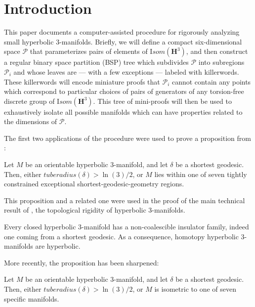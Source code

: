 \def\Arccosh{{\mathrm Arccosh}}
\chapter{Introduction}\label{Ch.intro}

This paper documents a computer-assisted procedure
for rigorously analyzing small hyperbolic $3$-manifolds.
Briefly, we will define a compact six-dimensional space ${\mathcal P}$
that parameterizes pairs of elements of ${\mathrm Isom}({\mathbf H}^3)$,
and then construct a regular binary space partition (BSP) tree
which subdivides ${\mathcal P}$ into subregions ${\mathcal P_i}$
and whose leaves are --- with a few exceptions --- labeled with killerwords.
These killerwords will encode miniature proofs that ${\mathcal P_i}$
cannot contain any points which correspond to
particular choices of pairs of generators of
any torsion-free discrete group of ${\mathrm Isom}({\mathbf H}^3)$.
This tree of mini-proofs will then be used
to exhaustively isolate all possible manifolds
which can have properties related to the dimensions of ${\mathcal P}$.

The first two applications of the procedure
were used to prove a proposition from \cite{GMT}:

\begin{proposition}{\cite{GMT}}
Let $M$ be an orientable hyperbolic $3$-manifold, and let $\delta$ be
a shortest geodesic. Then, either ${\mathit tuberadius}(\delta) > \ln(3)/2$,
or $M$ lies within one of seven tightly constrained
exceptional shortest-geodesic-geometry regions.
\end{proposition}

This proposition and a related one were used in the proof of
the main technical result of \cite{GMT}, the topological rigidity of hyperbolic 3-manifolds. 

\begin{theorem}{\cite{GMT}}\label{GMT 0.2}
Every closed hyperbolic $3$-manifold
has a non-coalescible insulator family,
indeed one coming from a shortest geodesic.
As a consequence,
homotopy hyperbolic $3$-manifolds are hyperbolic.
\end{theorem}

More recently, the proposition has been sharpened:

\begin{theorem}{}
Let $M$ be an orientable hyperbolic $3$-manifold,
and let $\delta$ be a shortest geodesic.
Then, either ${\mathit tuberadius}(\delta) > \ln(3)/2$, or
$M$ is isometric to one of seven specific manifolds.
\end{theorem}

